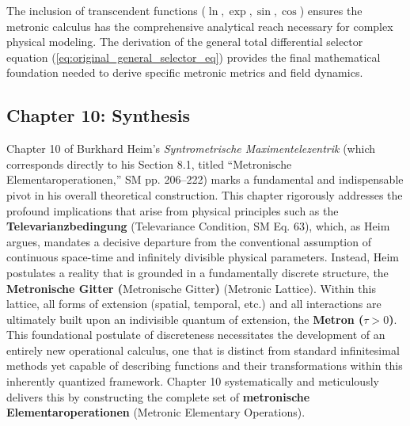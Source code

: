 \documentclass[12pt]{article}
\newcommand{\q}[1]{\enquote{#1}}
\newcommand{\metron}{\tau}
\newcommand{\metronischegitter}{\text{Metronische Gitter}}
\begin{document}
The inclusion of transcendent functions (\(\ln, \exp, \sin, \cos\)) ensures the metronic calculus has the comprehensive analytical reach necessary for complex physical modeling. The derivation of the general total differential selector equation (\eqref{eq:original_general_selector_eq}) provides the final mathematical foundation needed to derive specific metronic metrics and field dynamics.

\subsection{Chapter 10: Synthesis}
\label{sec:chapter10_synthesis}

Chapter 10 of Burkhard Heim's \textit{Syntrometrische Maximentelezentrik} (which corresponds directly to his Section 8.1, titled \q{Metronische Elementaroperationen,} SM pp. 206–222) marks a fundamental and indispensable pivot in his overall theoretical construction. This chapter rigorously addresses the profound implications that arise from physical principles such as the \textbf{Televarianzbedingung} (Televariance Condition, SM Eq. 63), which, as Heim argues, mandates a decisive departure from the conventional assumption of continuous space-time and infinitely divisible physical parameters. Instead, Heim postulates a reality that is grounded in a fundamentally discrete structure, the \textbf{Metronische Gitter (\(\metronischegitter\))} (Metronic Lattice). Within this lattice, all forms of extension (spatial, temporal, etc.) and all interactions are ultimately built upon an indivisible quantum of extension, the \textbf{Metron (\( \metron > 0 \))}. This foundational postulate of discreteness necessitates the development of an entirely new operational calculus, one that is distinct from standard infinitesimal methods yet capable of describing functions and their transformations within this inherently quantized framework. Chapter 10 systematically and meticulously delivers this by constructing the complete set of \textbf{metronische Elementaroperationen} (Metronic Elementary Operations).
\end{document}
